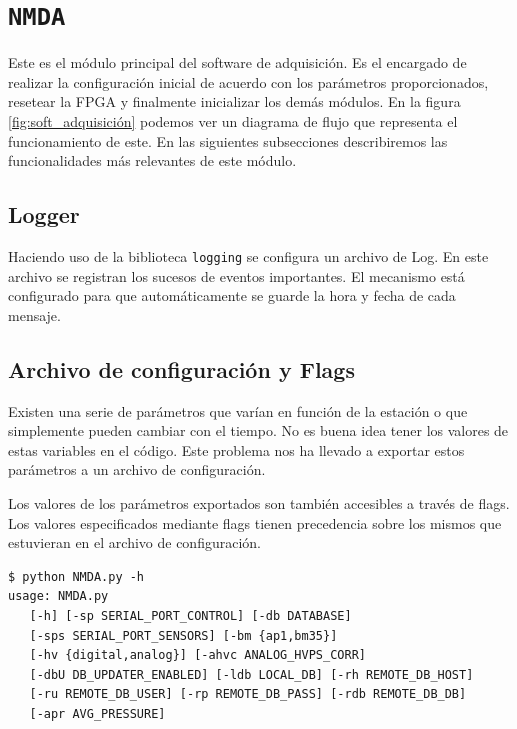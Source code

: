     \section{\texttt{NMDA}}
        Este es el módulo principal del software de adquisición. Es el encargado de realizar la configuración inicial de acuerdo con los parámetros
        proporcionados, resetear la FPGA y finalmente inicializar los demás módulos. En la figura \ref{fig:soft_adquisición} podemos ver un diagrama
        de flujo que representa el funcionamiento de este. En las siguientes subsecciones describiremos las funcionalidades más relevantes de este
        módulo.
        \subsection{Logger}
            Haciendo uso de la biblioteca \texttt{logging}\cite{py_logging} se
            configura un archivo de Log. En este archivo se registran los
            sucesos de eventos importantes. El mecanismo está configurado para
            que automáticamente se guarde la hora y fecha de cada mensaje.
        \subsection{Archivo de configuración y Flags}
            Existen una serie de parámetros que varían en función de la
            estación o que simplemente pueden cambiar con el tiempo. No es
            buena idea tener los valores de estas variables en el código. Este
            problema nos ha llevado a exportar estos parámetros a un archivo de
            configuración.
            \par
            Los valores de los parámetros exportados son también accesibles a
            través de flags. Los valores especificados mediante flags tienen
            precedencia sobre los mismos que estuvieran en el archivo de
            configuración.
            \begin{lstlisting}[style=myBash]
$ python NMDA.py -h
usage: NMDA.py 
   [-h] [-sp SERIAL_PORT_CONTROL] [-db DATABASE]
   [-sps SERIAL_PORT_SENSORS] [-bm {ap1,bm35}]
   [-hv {digital,analog}] [-ahvc ANALOG_HVPS_CORR]
   [-dbU DB_UPDATER_ENABLED] [-ldb LOCAL_DB] [-rh REMOTE_DB_HOST]
   [-ru REMOTE_DB_USER] [-rp REMOTE_DB_PASS] [-rdb REMOTE_DB_DB]
   [-apr AVG_PRESSURE]
            \end{lstlisting}

